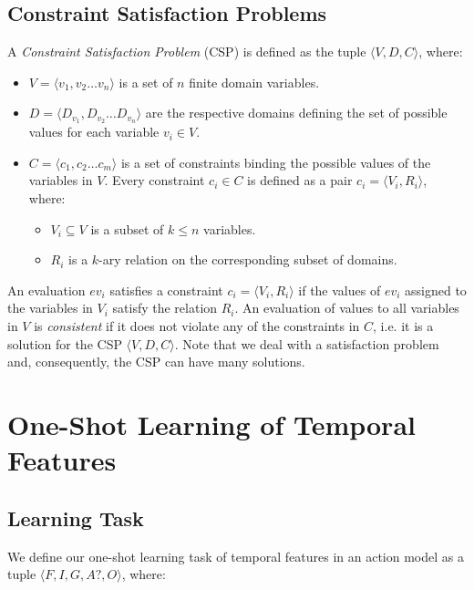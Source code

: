 \documentclass[10pt,journal,compsoc]{IEEEtran}
\newcommand{\tup}[1]{{\langle #1 \rangle}}
\begin{document}
\subsection{Constraint Satisfaction Problems}
\label{sec:csp}

A {\em Constraint Satisfaction Problem} (CSP) is defined as the tuple $\tup{V,D,C}$, where:

\begin{itemize}
	
	\item $V=\tup{v_1,v_2 \ldots v_n}$ is a set of $n$ finite domain variables.
	
	\item $D=\tup{D_{v_1},D_{v_2} \ldots D_{v_n}}$ are the respective domains defining the set of possible values for each variable $v_i \in V$.
	
	\item $C=\tup{c_1,c_2 \ldots c_m}$ is a set of constraints binding the possible values of the variables in $V$. Every constraint $c_i\in C$ is defined as a pair $c_i=\tup{V_i,R_i}$, where:
	\begin{itemize}
		\item $V_i\subseteq V$ is a subset of $k\leq n$ variables.
		\item $R_i$ is a $k$-ary relation on the corresponding subset of domains.
	\end{itemize}
\end{itemize}

An evaluation $ev_i$ satisfies a constraint $c_i=\tup{V_i,R_i}$ if the values of $ev_i$ assigned to the variables in $V_i$ satisfy the relation $R_i$. An evaluation of values to all variables in $V$ is {\em consistent} if it does not violate any of the constraints in $C$, i.e. it is a solution for the CSP $\tup{V,D,C}$. Note that we deal with a satisfaction problem and, consequently, the CSP can have many solutions.



\section{One-Shot Learning of Temporal Features}
\label{sec:learningTemporalFeatures}


\subsection{Learning Task}
\label{sec:learningtask}

We define our one-shot learning task of temporal features in an action model as a tuple $\tup{F,I,G,A?,O}$, where:
\end{document}
